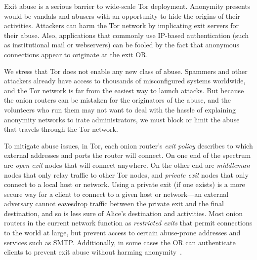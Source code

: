 \documentclass[times,10pt,twocolumn]{article}
\begin{document}
\label{subsec:exitpolicies}


Exit abuse is a serious barrier to wide-scale Tor deployment. Anonymity
presents would-be vandals and abusers with an opportunity to hide
the origins of their activities. Attackers can harm the Tor network by
implicating exit servers for their abuse. Also, applications that commonly
use IP-based authentication (such as institutional mail or webservers)
can be fooled by the fact that anonymous connections appear to originate
at the exit OR.

We stress that Tor does not enable any new class of abuse. Spammers
and other attackers already have access to thousands of misconfigured
systems worldwide, and the Tor network is far from the easiest way
to launch attacks.
But because the
onion routers can be mistaken for the originators of the abuse,
and the volunteers who run them may not want to deal with the hassle of
explaining anonymity networks to irate administrators, we must block or limit
the abuse that travels through the Tor network.

To mitigate abuse issues, in Tor, each onion router's \emph{exit policy}
describes to which external addresses and ports the router will
connect. On one end of the spectrum are \emph{open exit}
nodes that will connect anywhere. On the other end are \emph{middleman}
nodes that only relay traffic to other Tor nodes, and \emph{private exit}
nodes that only connect to a local host or network.  Using a private
exit (if one exists) is a more secure way for a client to connect to a
given host or network---an external adversary cannot eavesdrop traffic
between the private exit and the final destination, and so is less sure of
Alice's destination and activities. Most onion routers in the current
network function as
\emph{restricted exits} that permit connections to the world at large,
but prevent access to certain abuse-prone addresses and services such
as SMTP.
Additionally, in some cases the OR can authenticate clients to
prevent exit abuse without harming anonymity~\cite{or-discex00}.

\end{document}
